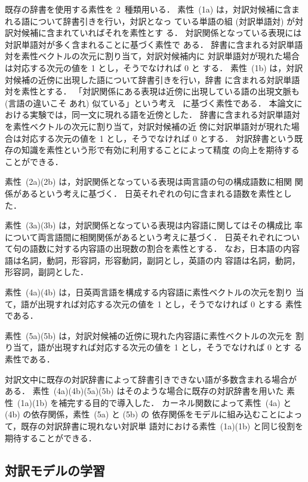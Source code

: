 既存の辞書を使用する素性を 2~種類用いる．
素性~(1a) は，対訳対候補に含まれる語について辞書引きを行い，対訳となっ
ている単語の組 (対訳単語対) が対訳対候補に含まれていればそれを素性とす
る．
対訳関係となっている表現には対訳単語対が多く含まれることに基づく素性で
ある．
辞書に含まれる対訳単語対を素性ベクトルの次元に割り当て，対訳対候補内に
対訳単語対が現れた場合は対応する次元の値を 1 とし，そうでなければ 0 と
する．
素性~(1b) は，対訳対候補の近傍に出現した語について辞書引きを行い，辞書
に含まれる対訳単語対を素性とする．
「対訳関係にある表現は近傍に出現している語の出現文脈も (言語の違いこそ
あれ) 似ている」という考え~\cite{kaji_01} に基づく素性である．
本論文における実験では，同一文に現れる語を近傍とした．
辞書に含まれる対訳単語対を素性ベクトルの次元に割り当て，対訳対候補の近
傍に対訳単語対が現れた場合は対応する次元の値を 1 とし，そうでなければ
0 とする．
対訳辞書という既存の知識を素性という形で有効に利用することによって精度
の向上を期待することができる．

素性~(2a)(2b) は，対訳関係となっている表現は両言語の句の構成語数に相関
関係があるという考えに基づく．
日英それぞれの句に含まれる語数を素性とした．

素性~(3a)(3b) は，対訳関係となっている表現は内容語に関してはその構成比
率について両言語間に相関関係があるという考えに基づく．
日英それぞれについて句の語数に対する内容語の出現数の割合を素性とする．
なお，日本語の内容語は名詞，動詞，形容詞，形容動詞，副詞とし，英語の内
容語は名詞，動詞，形容詞，副詞とした．

素性~(4a)(4b) は，日英両言語を構成する内容語に素性ベクトルの次元を割り
当て，語が出現すれば対応する次元の値を 1 とし，そうでなければ 0 とする
素性である．

素性~(5a)(5b) は，対訳対候補の近傍に現れた内容語に素性ベクトルの次元を
割り当て，語が出現すれば対応する次元の値を 1 とし，そうでなければ 0 とす
る素性である．

対訳文中に既存の対訳辞書によって辞書引きできない語が多数含まれる場合が
ある．
素性~(4a)(4b)(5a)(5b) はそのような場合に既存の対訳辞書を用いた
素性~(1a)(1b) を補完する目的で導入した．
カーネル関数によって素性~(4a) と (4b) の依存関係，素性~(5a) と (5b) の
依存関係をモデルに組み込むことによって，既存の対訳辞書に現れない対訳単
語対における素性~(1a)(1b) と同じ役割を期待することができる．

\subsection{対訳モデルの学習}
\label{sec:learn}

